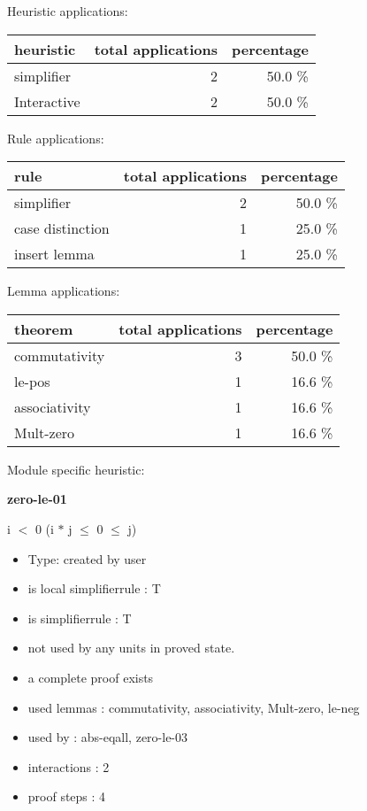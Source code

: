 \documentclass[a4paper]{article}
\begin{document}
\medskip


Heuristic applications:

\begin{supertabular}{l|r|r}
heuristic	& total applications & percentage \\ \hline
simplifier & 2 & 50.0 \% \\
Interactive & 2 & 50.0 \% \\

\end{supertabular}

Rule applications:

\begin{supertabular}{l|r|r}
rule	        & total applications & percentage \\ \hline
simplifier & 2 & 50.0 \% \\
case distinction & 1 & 25.0 \% \\
insert lemma & 1 & 25.0 \% \\

\end{supertabular}

Lemma applications:

\begin{supertabular}{l|r|r}
theorem	        & total applications & percentage \\ \hline
commutativity & 3 & 50.0 \% \\
le-pos & 1 & 16.6 \% \\
associativity & 1 & 16.6 \% \\
Mult-zero & 1 & 16.6 \% \\

\end{supertabular}

Module specific heuristic:

\pagebreak

{\LARGE\bf zero-le-01}\label{lemma-zero-le-01}

\medskip

 \Fol i $<$ 0 \Imp (i $*$ j $\le$ 0  $\le$ j)

\begin{itemize}

\item Type: created by user

\item is local simplifierrule : T
\item is simplifierrule : T
\item not used by any units in proved state.
\item       a complete proof exists
\item       used lemmas  : commutativity, associativity, Mult-zero, le-neg
\item       used by      : abs-eqall, zero-le-03
\item       interactions : 2
\item       proof steps  : 4
\end{itemize}
\end{document}
